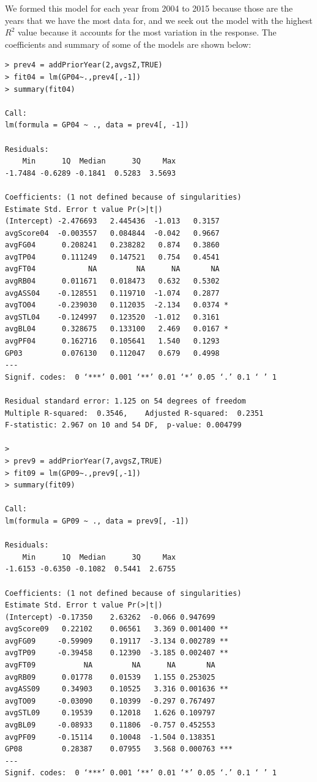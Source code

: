 \documentclass[]{scrartcl}
\begin{document}
We formed this model for each year from 2004 to 2015 because those are the years that we have the most data for, and we seek out the model with the highest $R^{2}$ value because it accounts for the most variation in the response. The coefficients and summary of some of the models are shown below:
\begin{verbatim}
> prev4 = addPriorYear(2,avgsZ,TRUE)
> fit04 = lm(GP04~.,prev4[,-1])
> summary(fit04)

Call:
lm(formula = GP04 ~ ., data = prev4[, -1])

Residuals:
    Min      1Q  Median      3Q     Max 
-1.7484 -0.6289 -0.1841  0.5283  3.5693 

Coefficients: (1 not defined because of singularities)
Estimate Std. Error t value Pr(>|t|)  
(Intercept) -2.476693   2.445436  -1.013   0.3157  
avgScore04  -0.003557   0.084844  -0.042   0.9667  
avgFG04      0.208241   0.238282   0.874   0.3860  
avgTP04      0.111249   0.147521   0.754   0.4541  
avgFT04            NA         NA      NA       NA  
avgRB04      0.011671   0.018473   0.632   0.5302  
avgASS04    -0.128551   0.119710  -1.074   0.2877  
avgTO04     -0.239030   0.112035  -2.134   0.0374 *
avgSTL04    -0.124997   0.123520  -1.012   0.3161  
avgBL04      0.328675   0.133100   2.469   0.0167 *
avgPF04      0.162716   0.105641   1.540   0.1293  
GP03         0.076130   0.112047   0.679   0.4998  
---
Signif. codes:  0 ‘***’ 0.001 ‘**’ 0.01 ‘*’ 0.05 ‘.’ 0.1 ‘ ’ 1

Residual standard error: 1.125 on 54 degrees of freedom
Multiple R-squared:  0.3546,	Adjusted R-squared:  0.2351 
F-statistic: 2.967 on 10 and 54 DF,  p-value: 0.004799

>
> prev9 = addPriorYear(7,avgsZ,TRUE)
> fit09 = lm(GP09~.,prev9[,-1])
> summary(fit09)

Call:
lm(formula = GP09 ~ ., data = prev9[, -1])

Residuals:
    Min      1Q  Median      3Q     Max 
-1.6153 -0.6350 -0.1082  0.5441  2.6755 

Coefficients: (1 not defined because of singularities)
Estimate Std. Error t value Pr(>|t|)    
(Intercept) -0.17350    2.63262  -0.066 0.947699    
avgScore09   0.22102    0.06561   3.369 0.001400 ** 
avgFG09     -0.59909    0.19117  -3.134 0.002789 ** 
avgTP09     -0.39458    0.12390  -3.185 0.002407 ** 
avgFT09           NA         NA      NA       NA    
avgRB09      0.01778    0.01539   1.155 0.253025    
avgASS09     0.34903    0.10525   3.316 0.001636 ** 
avgTO09     -0.03090    0.10399  -0.297 0.767497    
avgSTL09     0.19539    0.12018   1.626 0.109797    
avgBL09     -0.08933    0.11806  -0.757 0.452553    
avgPF09     -0.15114    0.10048  -1.504 0.138351    
GP08         0.28387    0.07955   3.568 0.000763 ***
---
Signif. codes:  0 ‘***’ 0.001 ‘**’ 0.01 ‘*’ 0.05 ‘.’ 0.1 ‘ ’ 1


\end{verbatim}
\end{document}
